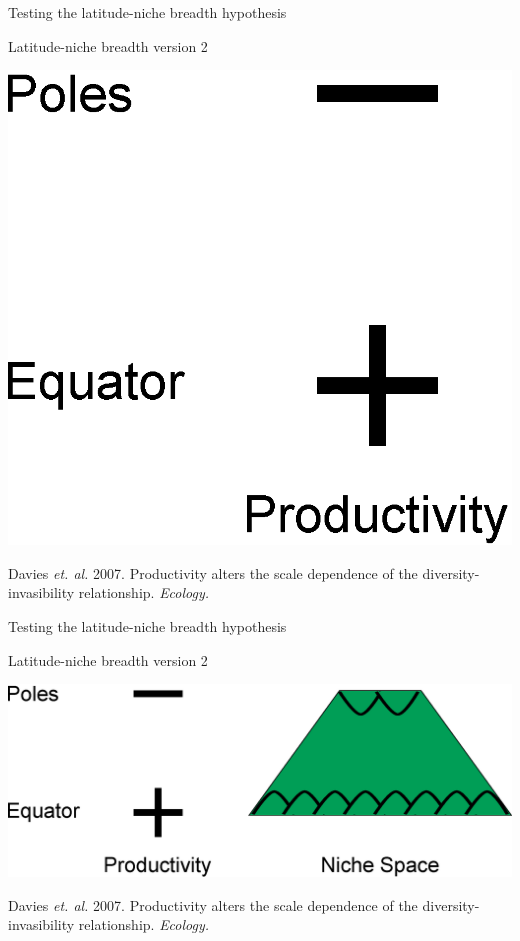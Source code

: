 \documentclass{beamer}
\begin{document}
  \begin{frame}{Testing the latitude-niche breadth hypothesis}
    \begin{block}{Latitude-niche breadth version 2}
    \begin{center}
      \includegraphics[width=.8\textwidth]{Figures/latitude_niche_breadth_4.eps}
    \end{center}

    \vspace{1cm}

    \tiny{Davies \emph{et. al.} 2007. Productivity alters the scale dependence of the diversity-invasibility relationship. \emph{Ecology.}}
    \end{block}
  \end{frame}


  \begin{frame}{Testing the latitude-niche breadth hypothesis}
    \begin{block}{Latitude-niche breadth version 2}
    \begin{center}
      \includegraphics[width=.8\textwidth]{Figures/latitude_niche_breadth_5.eps}
    \end{center}

    \vspace{1cm}

    \tiny{Davies \emph{et. al.} 2007. Productivity alters the scale dependence of the diversity-invasibility relationship. \emph{Ecology.}}
    \end{block}
  \end{frame}
\end{document}

